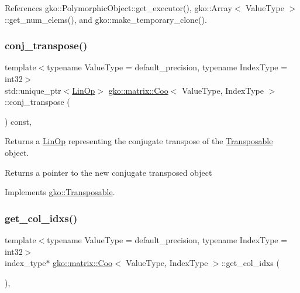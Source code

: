 References gko\+::\+Polymorphic\+Object\+::get\+\_\+executor(), gko\+::\+Array$<$ Value\+Type $>$\+::get\+\_\+num\+\_\+elems(), and gko\+::make\+\_\+temporary\+\_\+clone().

\mbox{\label{classgko_1_1matrix_1_1Coo_ac1d91c524ca616b4c9e5f2a62f3f55ce}} 
\subsubsection{\texorpdfstring{conj\+\_\+transpose()}{conj\_transpose()}}
{\footnotesize\ttfamily template$<$typename Value\+Type = default\+\_\+precision, typename Index\+Type = int32$>$ \\
std\+::unique\+\_\+ptr$<$\hyperlink{classgko_1_1LinOp}{Lin\+Op}$>$ \hyperlink{classgko_1_1matrix_1_1Coo}{gko\+::matrix\+::\+Coo}$<$ Value\+Type, Index\+Type $>$\+::conj\+\_\+transpose (\begin{DoxyParamCaption}{ }\end{DoxyParamCaption}) const\hspace{0.3cm}{\ttfamily [override]}, {\ttfamily [virtual]}}



Returns a \hyperlink{classgko_1_1LinOp}{Lin\+Op} representing the conjugate transpose of the \hyperlink{classgko_1_1Transposable}{Transposable} object. 

\begin{DoxyReturn}{Returns}
a pointer to the new conjugate transposed object 
\end{DoxyReturn}


Implements \hyperlink{classgko_1_1Transposable_ab41b669288740cf2a6f7bf76e875b077}{gko\+::\+Transposable}.

\mbox{\label{classgko_1_1matrix_1_1Coo_a1b619cf23c7c87cb4109432c8e8db66d}} 
\subsubsection{\texorpdfstring{get\+\_\+col\+\_\+idxs()}{get\_col\_idxs()}}
{\footnotesize\ttfamily template$<$typename Value\+Type = default\+\_\+precision, typename Index\+Type = int32$>$ \\
index\+\_\+type$\ast$ \hyperlink{classgko_1_1matrix_1_1Coo}{gko\+::matrix\+::\+Coo}$<$ Value\+Type, Index\+Type $>$\+::get\+\_\+col\+\_\+idxs (\begin{DoxyParamCaption}{ }\end{DoxyParamCaption})\hspace{0.3cm}{\ttfamily [inline]}, {\ttfamily [noexcept]}}



